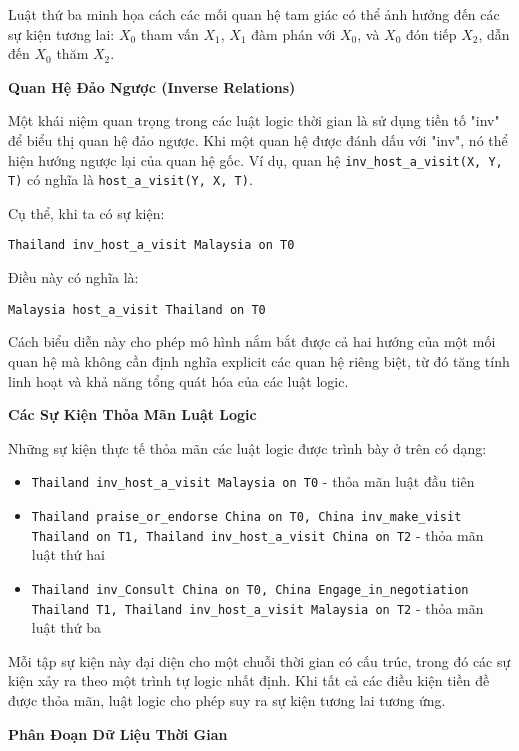 Luật thứ ba minh họa cách các mối quan hệ tam giác có thể ảnh hưởng đến các sự kiện tương lai: $X_0$ tham vấn $X_1$, $X_1$ đàm phán với $X_0$, và $X_0$ đón tiếp $X_2$, dẫn đến $X_0$ thăm $X_2$.

\textbf{Quan Hệ Đảo Ngược (Inverse Relations)}

Một khái niệm quan trọng trong các luật logic thời gian là sử dụng tiền tố "inv" để biểu thị quan hệ đảo ngược. Khi một quan hệ được đánh dấu với "inv", nó thể hiện hướng ngược lại của quan hệ gốc. Ví dụ, quan hệ \texttt{inv\_host\_a\_visit(X, Y, T)} có nghĩa là \texttt{host\_a\_visit(Y, X, T)}.

Cụ thể, khi ta có sự kiện:
\begin{center}
\texttt{Thailand inv\_host\_a\_visit Malaysia on T0}
\end{center}

Điều này có nghĩa là:
\begin{center}
\texttt{Malaysia host\_a\_visit Thailand on T0}
\end{center}

Cách biểu diễn này cho phép mô hình nắm bắt được cả hai hướng của một mối quan hệ mà không cần định nghĩa explicit các quan hệ riêng biệt, từ đó tăng tính linh hoạt và khả năng tổng quát hóa của các luật logic.

\textbf{Các Sự Kiện Thỏa Mãn Luật Logic}

Những sự kiện thực tế thỏa mãn các luật logic được trình bày ở trên có dạng:

\begin{itemize}
    \item \texttt{Thailand inv\_host\_a\_visit Malaysia on T0} - thỏa mãn luật đầu tiên
    \item \texttt{Thailand praise\_or\_endorse China on T0, China inv\_make\_visit Thailand on T1, Thailand inv\_host\_a\_visit China on T2} - thỏa mãn luật thứ hai
    \item \texttt{Thailand inv\_Consult China on T0, China Engage\_in\_negotiation Thailand T1, Thailand inv\_host\_a\_visit Malaysia on T2} - thỏa mãn luật thứ ba
\end{itemize}

Mỗi tập sự kiện này đại diện cho một chuỗi thời gian có cấu trúc, trong đó các sự kiện xảy ra theo một trình tự logic nhất định. Khi tất cả các điều kiện tiền đề được thỏa mãn, luật logic cho phép suy ra sự kiện tương lai tương ứng.

\textbf{Phân Đoạn Dữ Liệu Thời Gian}

